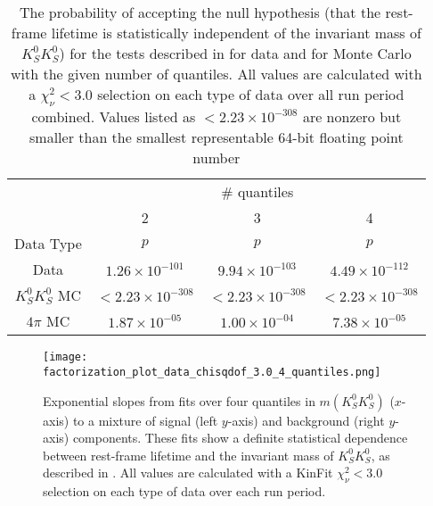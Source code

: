 \begin{table}
  \begin{center}
    \begin{tabular}{cccc}\toprule
       & \multicolumn{3}{c}{\# quantiles} \\\cmidrule(lr){2-4}
       & 2 & 3 & 4 \\
       Data Type & $p$ & $p$ & $p$ \\\midrule
      Data  & $1.26 \times 10^{-101}$ & $9.94 \times 10^{-103}$ & $4.49 \times 10^{-112}$\\
      $K_S^0K_S^0$ MC  & $<2.23\times 10^{-308}$ & $<2.23\times 10^{-308}$ & $<2.23\times 10^{-308}$\\
      $4\pi$ MC  & $1.87 \times 10^{-05}$ & $1.00 \times 10^{-04}$ & $7.38 \times 10^{-05}$\\\bottomrule
    \end{tabular}
    \caption{The probability of accepting the null hypothesis (that the rest-frame lifetime is statistically independent of the invariant mass of $K_S^0K_S^0$) for the tests described in  for data and  for Monte Carlo with the given number of quantiles. All values are calculated with a $\chi^2_\nu < 3.0$ selection on each type of data over all run period combined. Values listed as $<2.23 \times 10^{-308}$ are nonzero but smaller than the smallest representable 64-bit floating point number}\label{tab:factorization-results}
  \end{center}
\end{table}

\begin{figure}
  \begin{center}
    \texttt{[image: factorization\_plot\_data\_chisqdof\_3.0\_4\_quantiles.png]}
  \end{center}
  \caption{Exponential slopes from fits over four quantiles in $m(K_S^0K_S^0)$ ($x$-axis) to a mixture of signal (left $y$-axis) and background (right $y$-axis) components. These fits show a definite statistical dependence between rest-frame lifetime and the invariant mass of $K_S^0K_S^0$, as described in . All values are calculated with a KinFit $\chi^2_\nu < 3.0$ selection on each type of data over each run period.}\label{fig:data-factorization-fit}
\end{figure}

